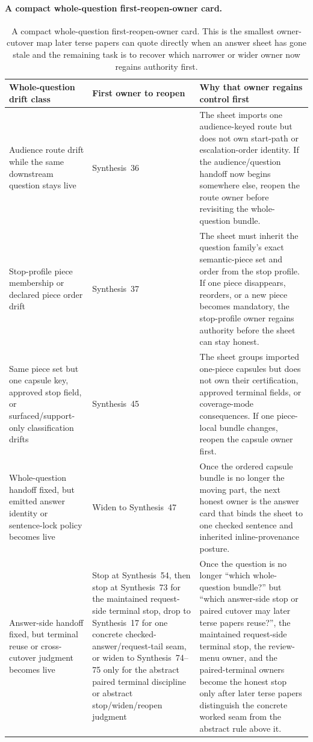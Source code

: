 \documentclass[11pt]{article}
\begin{document}
\paragraph{A compact whole-question first-reopen-owner card.}
\begin{table}[t]
\centering
\small
\begin{tabularx}{\linewidth}{@{}L Y Y@{}}
\toprule
Whole-question drift class & First owner to reopen & Why that owner regains control first \\
\midrule
Audience route drift while the same downstream question stays live & Synthesis~36 & The sheet imports one audience-keyed route but does not own start-path or escalation-order identity. If the audience/question handoff now begins somewhere else, reopen the route owner before revisiting the whole-question bundle. \\
Stop-profile piece membership or declared piece order drift & Synthesis~37 & The sheet must inherit the question family's exact semantic-piece set and order from the stop profile. If one piece disappears, reorders, or a new piece becomes mandatory, the stop-profile owner regains authority before the sheet can stay honest. \\
Same piece set but one capsule key, approved stop field, or surfaced/support-only classification drifts & Synthesis~45 & The sheet groups imported one-piece capsules but does not own their certification, approved terminal fields, or coverage-mode consequences. If one piece-local bundle changes, reopen the capsule owner first. \\
Whole-question handoff fixed, but emitted answer identity or sentence-lock policy becomes live & Widen to Synthesis~47 & Once the ordered capsule bundle is no longer the moving part, the next honest owner is the answer card that binds the sheet to one checked sentence and inherited inline-provenance posture. \\
Answer-side handoff fixed, but terminal reuse or cross-cutover judgment becomes live & Stop at Synthesis~54, then stop at Synthesis~73 for the maintained request-side terminal stop, drop to Synthesis~17 for one concrete checked-answer/request-tail seam, or widen to Synthesis~74--75 only for the abstract paired terminal discipline or abstract stop/widen/reopen judgment & Once the question is no longer ``which whole-question bundle?'' but ``which answer-side stop or paired cutover may later terse papers reuse?'', the maintained request-side terminal stop, the review-menu owner, and the paired-terminal owners become the honest stop only after later terse papers distinguish the concrete worked seam from the abstract rule above it. \\
\bottomrule
\end{tabularx}
\caption{A compact whole-question first-reopen-owner card. This is the smallest owner-cutover map later terse papers can quote directly when an answer sheet has gone stale and the remaining task is to recover which narrower or wider owner now regains authority first.}
\label{tab:answersheet-first-reopen-owner-card}
\end{table}
\end{document}

